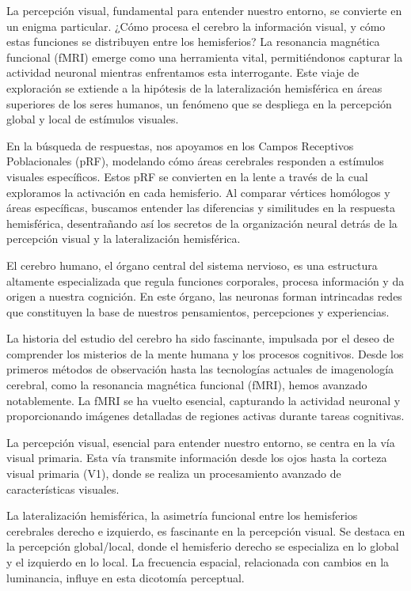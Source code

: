 \documentclass{article}
\begin{document}
	La percepción visual, fundamental para entender nuestro entorno, se convierte en un enigma particular. ¿Cómo procesa el cerebro la información visual, y cómo estas funciones se distribuyen entre los hemisferios? La resonancia magnética funcional (fMRI) emerge como una herramienta vital, permitiéndonos capturar la actividad neuronal mientras enfrentamos esta interrogante. Este viaje de exploración se extiende a la hipótesis de la lateralización hemisférica en áreas superiores de los seres humanos, un fenómeno que se despliega en la percepción global y local de estímulos visuales.
	
	En la búsqueda de respuestas, nos apoyamos en los Campos Receptivos Poblacionales (pRF), modelando cómo áreas cerebrales responden a estímulos visuales específicos. Estos pRF se convierten en la lente a través de la cual exploramos la activación en cada hemisferio. Al comparar vértices homólogos y áreas específicas, buscamos entender las diferencias y similitudes en la respuesta hemisférica, desentrañando así los secretos de la organización neural detrás de la percepción visual y la lateralización hemisférica.
	
	\newpage
	
	El cerebro humano, el órgano central del sistema nervioso, es una estructura altamente especializada que regula funciones corporales, procesa información y da origen a nuestra cognición. En este órgano, las neuronas forman intrincadas redes que constituyen la base de nuestros pensamientos, percepciones y experiencias.
	
	La historia del estudio del cerebro ha sido fascinante, impulsada por el deseo de comprender los misterios de la mente humana y los procesos cognitivos. Desde los primeros métodos de observación hasta las tecnologías actuales de imagenología cerebral, como la resonancia magnética funcional (fMRI), hemos avanzado notablemente. La fMRI se ha vuelto esencial, capturando la actividad neuronal y proporcionando imágenes detalladas de regiones activas durante tareas cognitivas.
	
	La percepción visual, esencial para entender nuestro entorno, se centra en la vía visual primaria. Esta vía transmite información desde los ojos hasta la corteza visual primaria (V1), donde se realiza un procesamiento avanzado de características visuales.
	
	La lateralización hemisférica, la asimetría funcional entre los hemisferios cerebrales derecho e izquierdo, es fascinante en la percepción visual. Se destaca en la percepción global/local, donde el hemisferio derecho se especializa en lo global y el izquierdo en lo local. La frecuencia espacial, relacionada con cambios en la luminancia, influye en esta dicotomía perceptual.
	
\end{document}
